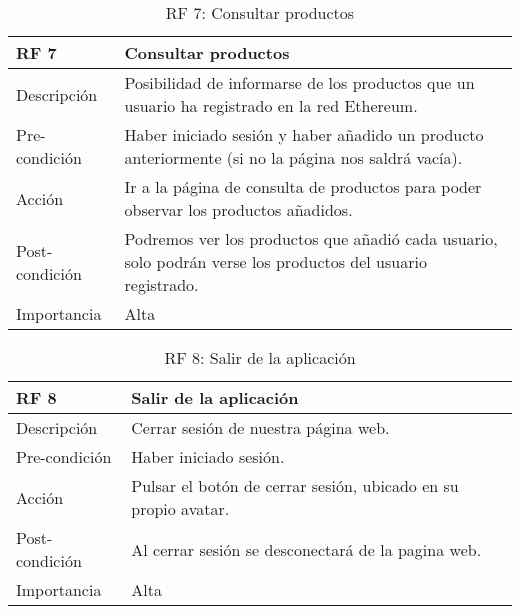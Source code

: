 \begin{table}[htbp]
\begin{center}
\begin{tabular}{|l|p{10cm}|}
\hline
\textbf{RF 7} & \textbf{Consultar productos}                                                                                \\ \hline
Descripción   & Posibilidad de informarse de los productos que un usuario ha registrado en la red Ethereum.                 \\ \hline
Pre-condición   & Haber iniciado sesión y haber añadido un producto anteriormente (si no la página nos saldrá vacía).         \\ \hline
Acción        & Ir a la página de consulta de productos para poder observar los productos añadidos.                         \\ \hline
Post-condición & Podremos ver los productos que añadió cada usuario, solo podrán verse los productos del usuario registrado. \\ \hline
Importancia   & Alta                                                                                                        \\ \hline
\end{tabular}
\caption{RF 7: Consultar productos}
	\label{tabla:tablaB7}
	\end{center}
\end{table}

\begin{table}[h!]
\begin{center}
\begin{tabular}{|l|p{10cm}|}
\hline
\textbf{RF 8} & \textbf{Salir de la aplicación}                                \\ \hline
Descripción   & Cerrar sesión de nuestra página web.                           \\ \hline
Pre-condición   & Haber iniciado sesión.                                         \\ \hline
Acción        & Pulsar el botón de cerrar sesión, ubicado en su propio avatar. \\ \hline
Post-condición & Al cerrar sesión se desconectará de la pagina web.             \\ \hline
Importancia   & Alta                                                           \\ \hline
\end{tabular}
\caption{RF 8: Salir de la aplicación}
	\label{tabla:tablaB8}
	\end{center}
\end{table}
